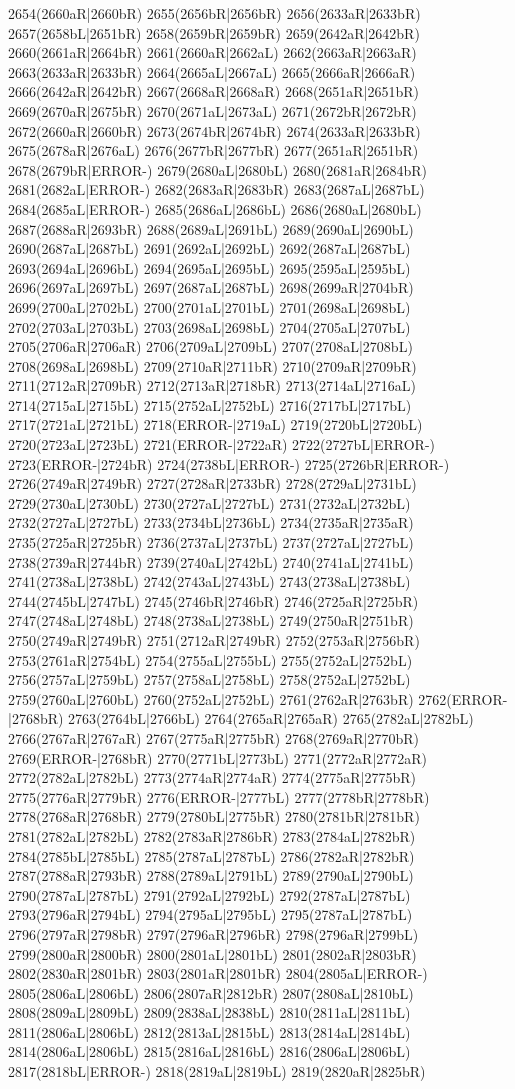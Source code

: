 2654(2660aR|2660bR) 2655(2656bR|2656bR) 2656(2633aR|2633bR) 2657(2658bL|2651bR) 2658(2659bR|2659bR) 2659(2642aR|2642bR) 2660(2661aR|2664bR) 2661(2660aR|2662aL) 2662(2663aR|2663aR) 2663(2633aR|2633bR) 2664(2665aL|2667aL) 2665(2666aR|2666aR) 2666(2642aR|2642bR) 2667(2668aR|2668aR) 2668(2651aR|2651bR) 2669(2670aR|2675bR) 2670(2671aL|2673aL) 2671(2672bR|2672bR) 2672(2660aR|2660bR) 2673(2674bR|2674bR) 2674(2633aR|2633bR) 2675(2678aR|2676aL) 2676(2677bR|2677bR) 2677(2651aR|2651bR) 2678(2679bR|ERROR-) 2679(2680aL|2680bL) 2680(2681aR|2684bR) 2681(2682aL|ERROR-) 2682(2683aR|2683bR) 2683(2687aL|2687bL) 2684(2685aL|ERROR-) 2685(2686aL|2686bL) 2686(2680aL|2680bL) 2687(2688aR|2693bR) 2688(2689aL|2691bL) 2689(2690aL|2690bL) 2690(2687aL|2687bL) 2691(2692aL|2692bL) 2692(2687aL|2687bL) 2693(2694aL|2696bL) 2694(2695aL|2695bL) 2695(2595aL|2595bL) 2696(2697aL|2697bL) 2697(2687aL|2687bL) 2698(2699aR|2704bR) 2699(2700aL|2702bL) 2700(2701aL|2701bL) 2701(2698aL|2698bL) 2702(2703aL|2703bL) 2703(2698aL|2698bL) 2704(2705aL|2707bL) 2705(2706aR|2706aR) 2706(2709aL|2709bL) 2707(2708aL|2708bL) 2708(2698aL|2698bL) 2709(2710aR|2711bR) 2710(2709aR|2709bR) 2711(2712aR|2709bR) 2712(2713aR|2718bR) 2713(2714aL|2716aL) 2714(2715aL|2715bL) 2715(2752aL|2752bL) 2716(2717bL|2717bL) 2717(2721aL|2721bL) 2718(ERROR-|2719aL) 2719(2720bL|2720bL) 2720(2723aL|2723bL) 2721(ERROR-|2722aR) 2722(2727bL|ERROR-) 2723(ERROR-|2724bR) 2724(2738bL|ERROR-) 2725(2726bR|ERROR-) 2726(2749aR|2749bR) 2727(2728aR|2733bR) 2728(2729aL|2731bL) 2729(2730aL|2730bL) 2730(2727aL|2727bL) 2731(2732aL|2732bL) 2732(2727aL|2727bL) 2733(2734bL|2736bL) 2734(2735aR|2735aR) 2735(2725aR|2725bR) 2736(2737aL|2737bL) 2737(2727aL|2727bL) 2738(2739aR|2744bR) 2739(2740aL|2742bL) 2740(2741aL|2741bL) 2741(2738aL|2738bL) 2742(2743aL|2743bL) 2743(2738aL|2738bL) 2744(2745bL|2747bL) 2745(2746bR|2746bR) 2746(2725aR|2725bR) 2747(2748aL|2748bL) 2748(2738aL|2738bL) 2749(2750aR|2751bR) 2750(2749aR|2749bR) 2751(2712aR|2749bR) 2752(2753aR|2756bR) 2753(2761aR|2754bL) 2754(2755aL|2755bL) 2755(2752aL|2752bL) 2756(2757aL|2759bL) 2757(2758aL|2758bL) 2758(2752aL|2752bL) 2759(2760aL|2760bL) 2760(2752aL|2752bL) 2761(2762aR|2763bR) 2762(ERROR-|2768bR) 2763(2764bL|2766bL) 2764(2765aR|2765aR) 2765(2782aL|2782bL) 2766(2767aR|2767aR) 2767(2775aR|2775bR) 2768(2769aR|2770bR) 2769(ERROR-|2768bR) 2770(2771bL|2773bL) 2771(2772aR|2772aR) 2772(2782aL|2782bL) 2773(2774aR|2774aR) 2774(2775aR|2775bR) 2775(2776aR|2779bR) 2776(ERROR-|2777bL) 2777(2778bR|2778bR) 2778(2768aR|2768bR) 2779(2780bL|2775bR) 2780(2781bR|2781bR) 2781(2782aL|2782bL) 2782(2783aR|2786bR) 2783(2784aL|2782bR) 2784(2785bL|2785bL) 2785(2787aL|2787bL) 2786(2782aR|2782bR) 2787(2788aR|2793bR) 2788(2789aL|2791bL) 2789(2790aL|2790bL) 2790(2787aL|2787bL) 2791(2792aL|2792bL) 2792(2787aL|2787bL) 2793(2796aR|2794bL) 2794(2795aL|2795bL) 2795(2787aL|2787bL) 2796(2797aR|2798bR) 2797(2796aR|2796bR) 2798(2796aR|2799bL) 2799(2800aR|2800bR) 2800(2801aL|2801bL) 2801(2802aR|2803bR) 2802(2830aR|2801bR) 2803(2801aR|2801bR) 2804(2805aL|ERROR-) 2805(2806aL|2806bL) 2806(2807aR|2812bR) 2807(2808aL|2810bL) 2808(2809aL|2809bL) 2809(2838aL|2838bL) 2810(2811aL|2811bL) 2811(2806aL|2806bL) 2812(2813aL|2815bL) 2813(2814aL|2814bL) 2814(2806aL|2806bL) 2815(2816aL|2816bL) 2816(2806aL|2806bL) 2817(2818bL|ERROR-) 2818(2819aL|2819bL) 2819(2820aR|2825bR) 